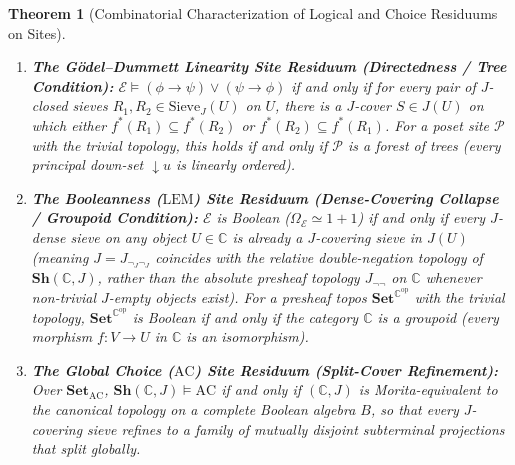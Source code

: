 \documentclass[10pt,twoside,openright]{book}
\theoremstyle{crmplain}
\newtheorem{theorem}{Theorem}[section]
\theoremstyle{crmdef}
\theoremstyle{crmremark}
\begin{document}
\begin{theorem}[Combinatorial Characterization of Logical and Choice Residuums on Sites]
\begin{enumerate}[label=(\arabic*),leftmargin=2em]
  \item \textbf{The Gödel--Dummett Linearity Site Residuum (Directedness / Tree Condition):} $\mathcal{E} \models (\phi \to \psi) \vee (\psi \to \phi)$ if and only if for every pair of $J$-closed sieves $R_1, R_2 \in \mathrm{Sieve}_J(U)$ on $U$, there is a $J$-cover $S \in J(U)$ on which either $f^*(R_1) \subseteq f^*(R_2)$ or $f^*(R_2) \subseteq f^*(R_1)$. For a poset site $\mathcal{P}$ with the trivial topology, this holds if and only if $\mathcal{P}$ is a \emph{forest of trees} (every principal down-set ${\downarrow} u$ is linearly ordered).

  \item \textbf{The Booleanness ($\mathrm{LEM}$) Site Residuum (Dense-Covering Collapse / Groupoid Condition):} $\mathcal{E}$ is Boolean ($\Omega_{\mathcal{E}} \simeq 1+1$) if and only if every $J$-dense sieve on any object $U \in \mathbb{C}$ is already a $J$-covering sieve in $J(U)$ (meaning $J = J_{\neg_J \neg_J}$ coincides with the relative double-negation topology of $\mathbf{Sh}(\mathbb{C}, J)$, rather than the absolute presheaf topology $J_{\neg\neg}$ on $\mathbb{C}$ whenever non-trivial $J$-empty objects exist). For a presheaf topos $\mathbf{Set}^{\mathbb{C}^{\mathrm{op}}}$ with the trivial topology, $\mathbf{Set}^{\mathbb{C}^{\mathrm{op}}}$ is Boolean if and only if the category $\mathbb{C}$ is a \emph{groupoid} (every morphism $f: V \to U$ in $\mathbb{C}$ is an isomorphism).

  \item \textbf{The Global Choice ($\mathrm{AC}$) Site Residuum (Split-Cover Refinement):} Over $\mathbf{Set}_{\mathrm{AC}}$, $\mathbf{Sh}(\mathbb{C}, J) \models \mathrm{AC}$ if and only if $(\mathbb{C}, J)$ is Morita-equivalent to the canonical topology on a complete Boolean algebra $B$, so that every $J$-covering sieve refines to a family of mutually disjoint subterminal projections that split globally.

\end{enumerate}

\end{theorem}
\end{document}
